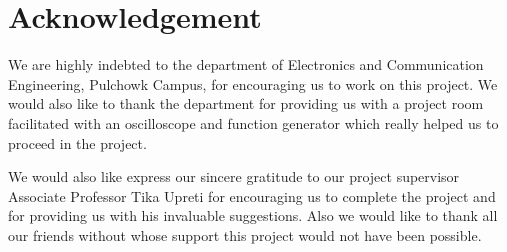 \section*{Acknowledgement}
We are highly indebted to the department of Electronics and Communication Engineering, Pulchowk Campus, for encouraging us to work on this project. We would also like to thank the department for providing us with a project room facilitated with an oscilloscope and function generator which really helped us to proceed in the project.

We would also like express our sincere gratitude to our project supervisor Associate Professor Tika Upreti for encouraging us to complete the project and for providing us with his invaluable suggestions. Also we would like to thank all our friends without whose support this project would not have been possible.

